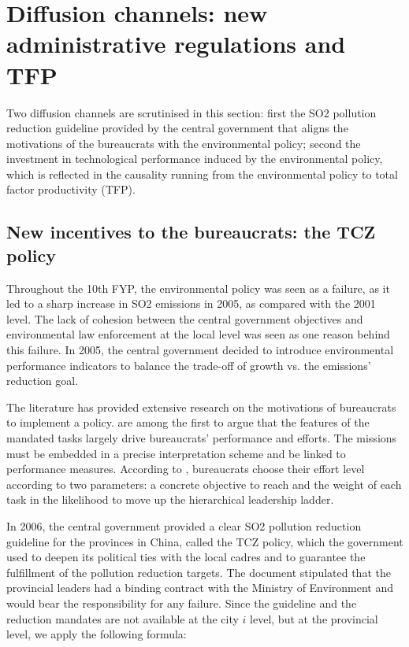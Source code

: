 \documentclass[12pt]{article}
\begin{document}
\section{Diffusion channels: new administrative regulations and TFP} \label{sec:channels}

Two diffusion channels are scrutinised in this section: first the SO2 pollution reduction guideline provided by the central government that aligns the motivations of the bureaucrats with the environmental policy; second the investment in technological performance induced by the environmental policy, which is reflected in the causality running from the environmental policy to total factor productivity (TFP).

\subsection{New incentives to the bureaucrats: the TCZ policy } \label{sec:bureaucrats}

Throughout the 10th FYP, the environmental policy was seen as a failure, as it led to a sharp increase in SO2 emissions in 2005, as compared with the 2001 level. The lack of cohesion between the central government objectives and environmental law enforcement at the local level was seen as one reason behind this failure. In 2005, the central government decided to introduce environmental performance indicators to balance the trade-off of growth vs. the emissions' reduction goal. 

The literature has provided extensive research on the motivations of bureaucrats to implement a policy. \cite{Dewatripont1999-nq,Dewatripont2000-ax, Alesina2007-xp} are among the first to argue that the features of the mandated tasks largely drive bureaucrats' performance and efforts. The missions must be embedded in a precise interpretation scheme and be linked to performance measures. According to \cite{Alesina2008-eq}, bureaucrats choose their effort level according to two parameters: a concrete objective to reach and the weight of each task in the likelihood to move up the hierarchical leadership ladder. 

In 2006, the central government provided a clear SO2 pollution reduction guideline for the provinces in China, called the TCZ policy, which the government used to deepen its political ties with the local cadres and to guarantee the fulfillment of the pollution reduction targets. The document stipulated that the provincial leaders had a binding contract with the Ministry of Environment and would bear the responsibility for any failure. Since the guideline and the reduction mandates are not available at the city $i$ level, but at the provincial level, we apply the following formula:
\end{document}
